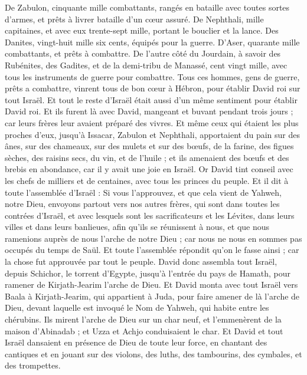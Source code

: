 \begin{multicols}{2}
De Zabulon, cinquante mille combattants, rangés en bataille avec toutes sortes d'armes, et prêts à livrer bataille d’un cœur  assuré.
De Nephthali, mille capitaines, et avec eux trente-sept mille, portant le bouclier et la lance.
Des Danites, vingt-huit mille six cents, équipés pour la guerre.
D'Aser, quarante mille combattants, et prêts à combattre.
De l’autre côté du Jourdain, à savoir des Rubénites, des Gadites, et de la demi-tribu de Manassé, cent vingt mille, avec tous les instruments de guerre pour combattre.
Tous ces hommes, gens de guerre, prêts a combattre, vinrent tous de bon cœur à Hébron, pour établir David roi sur tout Israël. Et tout le reste d'Israël était aussi d'un même sentiment pour établir David roi.
Et ils furent là avec David, mangeant et buvant pendant trois jours ; car leurs frères leur avaient préparé des vivres.
Et même ceux qui étaient les plus proches d'eux, jusqu'à Issacar, Zabulon et Nephthali, apportaient du pain sur des ânes, sur des chameaux, sur des mulets et sur des bœufs, de la farine, des figues sèches, des raisins secs, du vin, et de l'huile ; et ils amenaient des bœufs et des brebis en abondance, car il y avait une joie en Israël.
\VerseOne{}Or David tint conseil avec les chefs de milliers et de centaines, avec tous les princes du peuple.
Et il dit à toute l'assemblée d'Israël : Si vous l'approuvez, et que cela vient de Yahweh, notre Dieu, envoyons partout vers nos autres frères, qui sont dans toutes les contrées d'Israël, et avec lesquels sont les sacrificateurs et les Lévites, dans leurs villes et dans leurs banlieues, afin qu'ils se réunissent à nous,
et que nous ramenions auprès de nous l’arche de notre Dieu ; car nous ne nous en sommes pas occupés du temps de Saül.
Et toute l'assemblée répondit qu'on le fasse ainsi ; car la chose fut approuvée par tout le peuple.
David donc assembla tout Israël, depuis Schichor, le torrent d'Egypte, jusqu'à l'entrée du pays de Hamath, pour ramener de Kirjath-Jearim l’arche de Dieu.
Et David monta avec tout Israël vers Baala à Kirjath-Jearim, qui appartient à Juda, pour faire amener de là l’arche de Dieu, devant laquelle est invoqué le Nom de Yahweh, qui habite entre les chérubins.
Ils mirent l’arche de Dieu sur un char neuf, et l'emmenèrent de la maison d'Abinadab ; et Uzza et Achjo conduisaient le char.
Et David et tout Israël dansaient en présence de Dieu de toute leur force, en chantant des cantiques et en jouant sur des violons, des luths, des tambourins, des cymbales, et des trompettes.

\end{multicols}
